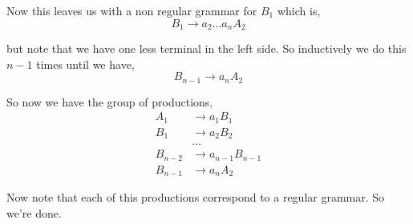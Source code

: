 \documentclass[11pt]{article}
\begin{document}
\begin{enumerate}
      Now this leaves us with a non regular grammar for $B_{1}$ which is, 
      \[
        B_{1} \to a_{2} \dots a_n A_{2}
      \]

      but note that we have one less terminal in the left side. So inductively we do this $n - 1$ times until we have, 
      \[
        B_{n - 1} \to a_n A_{2}
      \]

      So now we have the group of productions, 
      \begin{align*}
        A_{1} &\to a_{1}B_{1} \\
        B_{1} &\to a_{2} B_{2}\\
              &\dots\\
        B_{n - 2} &\to a_{n - 1}B_{n - 1}\\
        B_{n - 1} &\to a_n A_{2}
      \end{align*}

      Now note that each of this productions correspond to a regular grammar. So we're done.
\end{enumerate}
\nocite{*}
\printbibliography[title={Further Reading},notcategory=cited]
\end{document}
